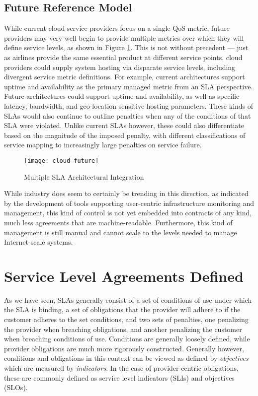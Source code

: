 \subsection{Future Reference Model}
While current cloud service providers focus on a single QoS metric, future providers may very well begin to provide multiple metrics over which they will define service levels, as shown in Figure \ref{fig:future-cloud-model}.  This is not without precedent --- just as airlines provide the same essential product at different service points, cloud providers could supply system hosting via disparate service levels, including divergent service metric definitions.  For example, current architectures support uptime and availability as the primary managed metric from an SLA perspective.  Future architectures could support uptime and availability, as well as specific latency, bandwidth, and geo-location sensitive hosting parameters.  These kinds of SLAs would also continue to outline penalties when any of the conditions of that SLA were violated.  Unlike current SLAs however, these could also differentiate based on the magnitude of the imposed penalty, with different classifications of service mapping to increasingly large penalties on service failure.

\begin{figure}[!t]
\centering
\texttt{[image: cloud-future]}
\caption{Multiple SLA Architectural Integration}
\label{fig:future-cloud-model}
\end{figure}

While industry does seem to certainly be trending in this direction, as indicated by the development of tools supporting user-centric infrastructure monitoring and management, this kind of control is not yet embedded into contracts of any kind, much less agreements that are machine-readable. Furthermore, this kind of management is still manual and cannot scale to the levels needed to manage Internet-scale systems.

\section{Service Level Agreements Defined}\label{sec:SLA-defined}
As we have seen, SLAs generally consist of a set of conditions of use under which the SLA is binding, a set of obligations that the provider will adhere to if the customer adheres to the set conditions, and two sets of penalties, one penalizing the provider when breaching obligations, and another penalizing the customer when breaching conditions of use.  Conditions are generally loosely defined, while provider obligations are much more rigorously constructed.  Generally however, conditions and obligations in this context can be viewed as defined by {\it objectives} which are measured by {\it indicators}.  In the case of provider-centric obligations, these are commonly defined as service level indicators (SLIs) and objectives (SLOs).

